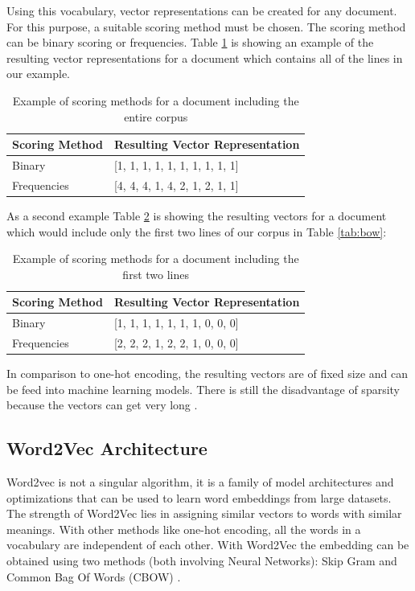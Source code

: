 Using this vocabulary, vector representations can be created for any document. For this purpose, a suitable scoring method must be chosen. The scoring method can be binary scoring or frequencies. Table \ref{tab:scoring1} is showing an example of the resulting vector representations for a document which contains all of the lines in our example.

\begin{table}[H]
	\centering
	\begin{tabular}{ll}
		\hline
		\textbf{Scoring Method} & \textbf{Resulting Vector Representation}                                         \\ \hline
		Binary & [1, 1, 1, 1, 1, 1, 1, 1, 1, 1] \\ \hline
		Frequencies & [4, 4, 4, 1, 4, 2, 1, 2, 1, 1] \\ \hline
	\end{tabular}
	\caption{Example of scoring methods for a document including the entire corpus}
	\label{tab:scoring1}
\end{table}

As a second example Table \ref{tab:scoring2} is showing the resulting vectors for a document which would include only the first two lines of our corpus in Table \ref{tab:bow}:

\begin{table}[H]
	\centering
	\begin{tabular}{ll}
		\hline
		\textbf{Scoring Method} & \textbf{Resulting Vector Representation}                                         \\ \hline
		Binary & [1, 1, 1, 1, 1, 1, 1, 0, 0, 0] \\ \hline
		Frequencies & [2, 2, 2, 1, 2, 2, 1, 0, 0, 0] \\ \hline
	\end{tabular}
	\caption{Example of scoring methods for a document including the first two lines}
	\label{tab:scoring2}
\end{table}

In comparison to one-hot encoding, the resulting vectors are of fixed size and can be feed into machine learning models. There is still the disadvantage of sparsity because the vectors can get very long \cite{word2vec}.

\subsection{Word2Vec Architecture}
Word2vec is not a singular algorithm, it is a family of model architectures and optimizations that can be used to learn word embeddings from large datasets. The strength of Word2Vec lies in assigning similar vectors to words with similar meanings. With other methods like one-hot encoding, all the words in a vocabulary are independent of each other. With Word2Vec the embedding can be obtained using two methods (both involving Neural Networks): Skip Gram and Common Bag Of Words (CBOW) \cite{word2vec}.

